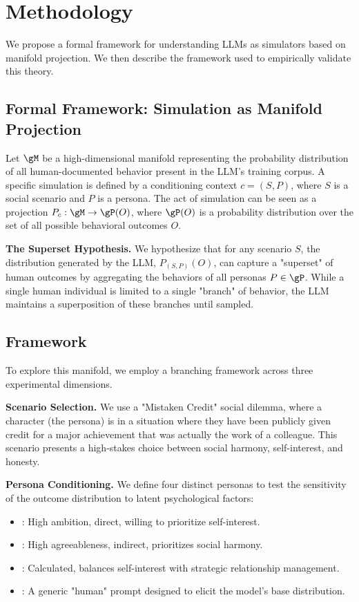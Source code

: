 \section{Methodology}
\label{sec:method}

We propose a formal framework for understanding LLMs as simulators based on manifold projection. We then describe the \method framework used to empirically validate this theory.

\subsection{Formal Framework: Simulation as Manifold Projection}
Let $\gM$ be a high-dimensional manifold representing the probability distribution of all human-documented behavior present in the LLM's training corpus. A specific simulation is defined by a conditioning context $c = (S, P)$, where $S$ is a social scenario and $P$ is a persona. The act of simulation can be seen as a projection $P_c: \gM \to \gP(O)$, where $\gP(O)$ is a probability distribution over the set of all possible behavioral outcomes $O$.

{\bf The Superset Hypothesis.} We hypothesize that for any scenario $S$, the distribution generated by the LLM, $P_{(S, P)}(O)$, can capture a "superset" of human outcomes by aggregating the behaviors of all personas $P \in \gP$. While a single human individual is limited to a single "branch" of behavior, the LLM maintains a superposition of these branches until sampled.

\subsection{\method Framework}

To explore this manifold, we employ a branching framework across three experimental dimensions.

{\bf Scenario Selection.} We use a "Mistaken Credit" social dilemma, where a character (the persona) is in a situation where they have been publicly given credit for a major achievement that was actually the work of a colleague. This scenario presents a high-stakes choice between social harmony, self-interest, and honesty.

{\bf Persona Conditioning.} We define four distinct personas to test the sensitivity of the outcome distribution to latent psychological factors:
\begin{itemize}[leftmargin=*,itemsep=0pt,topsep=0pt]
    \item \aggressive: High ambition, direct, willing to prioritize self-interest.
    \item \passive: High agreeableness, indirect, prioritizes social harmony.
    \item \strategic: Calculated, balances self-interest with strategic relationship management.
    \item \generic: A generic "human" prompt designed to elicit the model's base distribution.
\end{itemize}

